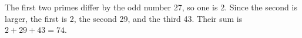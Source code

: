 The first two primes differ by the odd number 27, so one is 2. Since the second is larger, the first is 2, the second 29, and the third 43. Their sum is $2+29+43=\boxed{74}$.
